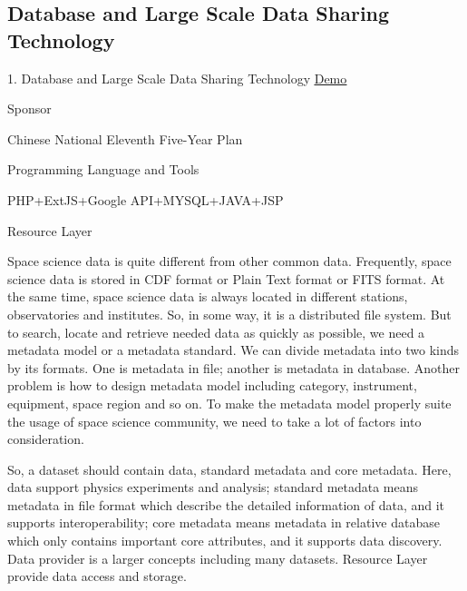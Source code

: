 \documentclass[10pt,letterpaper]{article}
\renewenvironment{itemize}{
  \begin{list}{}{
    \setlength{\leftmargin}{1.5em}
    \setlength{\itemsep}{0.25em}
    \setlength{\parskip}{0pt}
    \setlength{\parsep}{0.25em}
  }
}{
  \end{list}
}
\begin{document}
\subsection*{Database and Large Scale Data Sharing Technology}
\begin{itemize}
\item 1. Database and Large Scale Data Sharing Technology \href{https://ssdg.cssar.ac.cn/}{\underline{Demo}}
\begin{itemize}
	\item Sponsor
	\begin{itemize}
	\item Chinese National Eleventh Five-Year Plan
	\end{itemize}
	
	\item Programming Language and Tools
	\begin{itemize}
	\item PHP+ExtJS+Google API+MYSQL+JAVA+JSP
	\end{itemize}

	\item Resource Layer
	\begin{itemize}
	\item Space science data is quite different from other common data. Frequently, space science data is stored in CDF format or Plain Text format or FITS format. At the same time, space science data is always located in different stations, observatories and institutes. So, in some way, it is a distributed file system. But to search, locate and retrieve needed data as quickly as possible, we need a metadata model or a metadata standard. We can divide metadata into two kinds by its formats. One is metadata in file; another is metadata in database. 
Another problem is how to design metadata model including category, instrument, equipment, space region and so on. To make the metadata model properly suite the usage of space science community, we need to take a lot of factors into consideration. 
	\item So, a dataset should contain data, standard metadata and core metadata. Here, data support physics experiments and analysis; standard metadata means metadata in file format which describe the detailed information of data, and it supports interoperability; core metadata means metadata in relative database which only contains important core attributes, and it supports data discovery. Data provider is a larger concepts including many datasets. 
Resource Layer provide data access and storage.
	\end{itemize}


\end{itemize}
\end{itemize}
\end{document}
